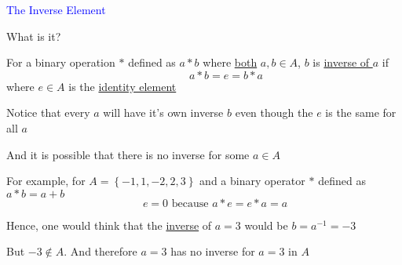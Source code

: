 \documentclass[14pt,fleqn]{extarticle}
\begin{document}
 
\begin{skill}
    \begin{narrow}
         \textcolor{blue}{The Inverse Element}
         
         What is it? 
    \end{narrow}
    \reason 
    
    For a binary operation $*$ defined as $a*b$ where \underline{both} $a,b\in A$, $b$ is \underline{inverse of $a$} if 
    \[ \qquad \qquad a * b = e = b * a \]
    where $e\in A$ is the \underline{identity element}\newline 
    
    Notice that every $a$ will have it's own inverse $b$ even though the $e$ is the same for all $a$ \newline 
    
    And it is possible that there is no inverse for some $a\in A$\newline 
    
    For example, for $A = \left\lbrace -1,1,-2,2,3 \right\rbrace$ and a binary operator $*$ defined as $a*b = a + b$ 
    \[ \qquad e = 0\text{ because } a * e = e * a = a \]
    
    Hence, one would think that the \underline{inverse} of $a=3$ would be 
    $b = a^{-1} = -3$ \newline 
    
    But $-3\notin A$. And therefore $a=3$ has no inverse for $a=3$ in $A$
\end{skill}
\end{document}
